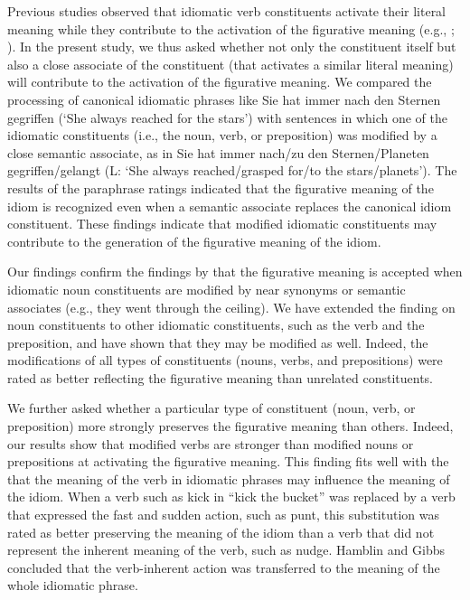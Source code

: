 \documentclass[output=paper]{langsci/langscibook}
\begin{document}
Previous studies observed that idiomatic verb constituents activate their literal meaning while they contribute to the activation of the figurative meaning (e.g., \citet{rabanus:2008}; \citet{smolka:2007}). In the present study, we thus asked whether not only the constituent itself but also a close associate of the constituent (that activates a similar literal meaning) will contribute to the activation of the figurative meaning. We compared the processing of canonical idiomatic phrases like Sie hat immer nach den Sternen gegriffen (‘She always reached for the stars’) with sentences in which one of the idiomatic constituents (i.e., the noun, verb, or preposition) was modified by a close semantic associate, as in Sie hat immer nach/zu den Sternen/Planeten gegriffen/gelangt (L: ‘She always reached/grasped for/to the stars/planets’). The results of the paraphrase ratings indicated that the figurative meaning of the idiom is recognized even when a semantic associate replaces the canonical idiom constituent. These findings indicate that modified idiomatic constituents may contribute to the generation of the figurative meaning of the idiom. 

Our findings confirm the findings by \citet{geeraert:2017} that the figurative meaning is accepted when idiomatic noun constituents are modified by near synonyms or semantic associates (e.g., they went through the ceiling).  We have extended the finding on noun constituents to other idiomatic constituents, such as the verb and the preposition, and have shown that they may be modified as well. Indeed, the modifications of all types of constituents (nouns, verbs, and prepositions) were rated as better reflecting the figurative meaning than unrelated constituents. 

We further asked whether a particular type of constituent (noun, verb, or preposition) more strongly preserves the figurative meaning than others.  Indeed, our results show that modified verbs are stronger than modified nouns or prepositions at activating the figurative meaning. This finding fits well with the\citet{hamblin:1999} that the meaning of the verb in idiomatic phrases may influence the meaning of the idiom. When a verb such as kick in “kick the bucket” was replaced by a verb that expressed the fast and sudden action, such as punt, this substitution was rated as better preserving the meaning of the idiom than a verb that did not represent the inherent meaning of the verb, such as nudge. Hamblin and Gibbs concluded that the verb-inherent action was transferred to the meaning of the whole idiomatic phrase.
\end{document}
